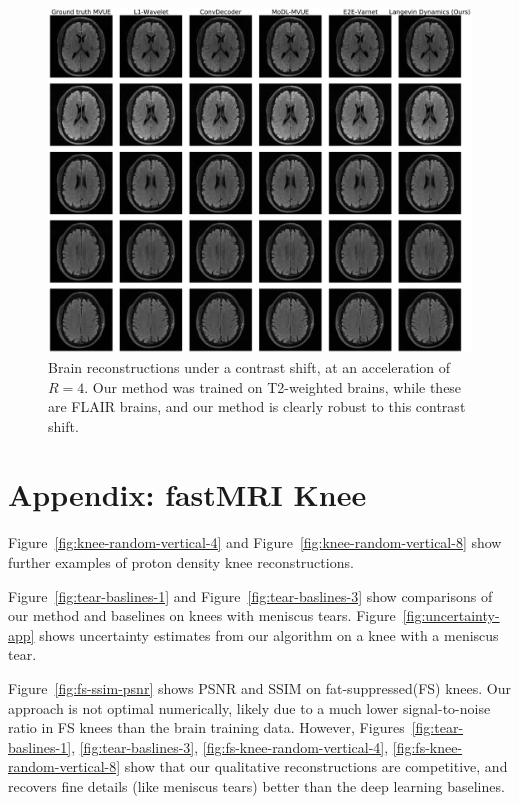 \begin{figure}
    \centering
    \includegraphics[width=\columnwidth]{brains-flair-equispaced-vertical-4-flipped-mvue-comp.pdf}
    \caption{Brain reconstructions under a contrast shift, at an acceleration of $R=4$. Our method was trained on T2-weighted brains, while these are FLAIR brains, and our method is clearly robust to this contrast shift.}
    \label{fig:brain-flair-4}
\end{figure}
\clearpage

\section{Appendix: fastMRI Knee}\label{app:knees}
Figure~\ref{fig:knee-random-vertical-4} and Figure~\ref{fig:knee-random-vertical-8} show further examples of proton density knee reconstructions. 



Figure~\ref{fig:tear-baslines-1} and Figure~\ref{fig:tear-baslines-3} show comparisons of our method and baselines on knees with meniscus tears. Figure~\ref{fig:uncertainty-app} shows uncertainty estimates from our algorithm on a knee with a meniscus tear.

Figure~\ref{fig:fs-ssim-psnr} shows PSNR and SSIM on fat-suppressed(FS) knees. Our approach is not optimal numerically, likely due to a much lower signal-to-noise ratio in FS knees than the brain training data. However, Figures~\ref{fig:tear-baslines-1}, \ref{fig:tear-baslines-3}, \ref{fig:fs-knee-random-vertical-4}, \ref{fig:fs-knee-random-vertical-8} show that our qualitative reconstructions are competitive, and recovers fine details (like meniscus tears) better than the deep learning baselines.


